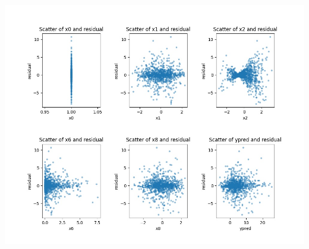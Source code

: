 \documentclass{article}
\begin{document}
\begin{center}
\includegraphics[width = 1\textwidth]{images/Scatter_res.jpg}
\end{center}
\end{document}

